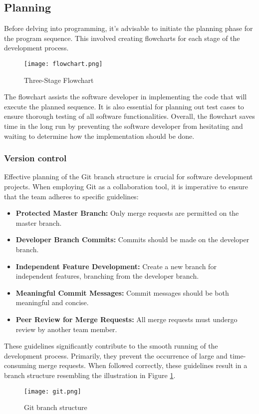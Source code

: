 \documentclass[../report.tex]{subfiles}
\begin{document}
    \subsection{Planning}
    Before delving into programming, it's advisable to initiate the planning
    phase for the program sequence. This involved creating flowcharts for each
    stage of the development process.

    
    \begin{figure}[H]
        \centering
        \texttt{[image: flowchart.png]}
        \caption{Three-Stage Flowchart}
    \end{figure}

    The flowchart assists the software developer in implementing the code that
    will execute the planned sequence. It is also essential for planning out
    test cases to ensure thorough testing of all software functionalities.
    Overall, the flowchart saves time in the long run by preventing the
    software developer from hesitating and waiting to determine how the
    implementation should be done.

    \subsubsection{Version control}
    Effective planning of the Git branch structure is crucial for software
    development projects. When employing Git as a collaboration tool, it is
    imperative to ensure that the team adheres to specific guidelines:
    \begin{itemize}
        \item \textbf{Protected Master Branch:} Only merge requests are permitted on the master branch.
        \item \textbf{Developer Branch Commits:} Commits should be made on the developer branch.
        \item \textbf{Independent Feature Development:} Create a new branch for independent features, branching from the developer branch.
        \item \textbf{Meaningful Commit Messages:} Commit messages should be both meaningful and concise.
        \item \textbf{Peer Review for Merge Requests:} All merge requests must undergo review by another team member.
    \end{itemize}
    These guidelines significantly contribute to the smooth running of the
    development process. Primarily, they prevent the occurrence of large and
    time-consuming merge requests. When followed correctly, these guidelines
    result in a branch structure resembling the illustration in Figure
    \ref{fig:git}.
    \begin{figure}[H]
        \centering
        \texttt{[image: git.png]}
        \caption{Git branch structure}
        \label{fig:git}
    \end{figure}
\end{document}
